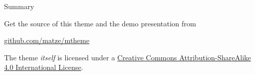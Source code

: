 \documentclass[10pt, compress]{beamer}
\begin{document}
\begin{frame}{Summary}

  Get the source of this theme and the demo presentation from

  \begin{center}\url{github.com/matze/mtheme}\end{center}

  The theme \emph{itself} is licensed under a
  \href{http://creativecommons.org/licenses/by-sa/4.0/}{Creative Commons
  Attribution-ShareAlike 4.0 International License}.

  \begin{center}\ccbysa\end{center}

\end{frame}

\end{document}
